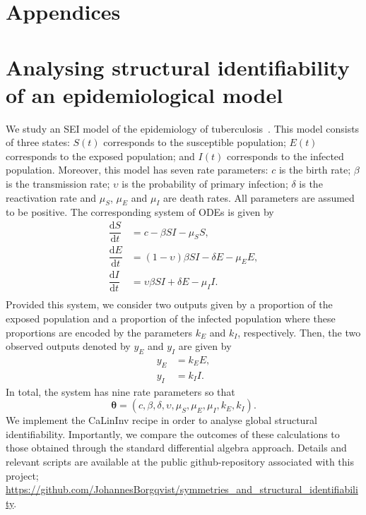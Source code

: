 \documentclass[12pt]{article}
\begin{document}





\section*{Appendices}



\section{Analysing structural identifiability of an epidemiological model}

We study an SEI model of the epidemiology of tuberculosis~\cite{renardy2022structural}. This model consists of three states: $S(t)$ corresponds to the susceptible population; $E(t)$ corresponds to the exposed population; and $I(t)$ corresponds to the infected population. Moreover, this model has seven rate parameters: $c$ is the birth rate; $\beta$ is the transmission rate; $\upsilon$ is the probability of primary infection; $\delta$ is the reactivation rate and $\mu_{S}$, $\mu_{E}$ and $\mu_{I}$ are death rates. All parameters are assumed to be positive. The corresponding system of ODEs is given by
\begin{equation}
    \begin{split}
\dfrac{\mathrm{d}S}{\mathrm{d}t}&=c-\beta SI-\mu_{S}S,\\
\dfrac{\mathrm{d}E}{\mathrm{d}t}&=(1-\upsilon)\beta SI-\delta E-\mu_{E}E,\\
\dfrac{\mathrm{d}I}{\mathrm{d}t}&=\upsilon\beta SI+\delta E-\mu_{I}I.\\
\end{split}
    \label{eq:SEI_app}
\end{equation}
Provided this system, we consider two outputs given by a proportion of the exposed population and a proportion of the infected population where these proportions are encoded by the parameters $k_{E}$ and $k_{I}$, respectively. Then, the two observed outputs denoted by $y_{E}$ and $y_{I}$ are given by
\begin{align}
    y_{E}&=k_{E}E,\label{eq:output_E_app}\\
    y_{I}&=k_{I}I.\label{eq:output_I_app}
\end{align}
In total, the system has nine rate parameters so that
\begin{equation}
\boldsymbol{\theta}=(c,\beta,\delta,\upsilon,\mu_{S},\mu_{E},\mu_{I},k_{E},k_{I}).
\label{eq:theta_SEI_app}
\end{equation}
We implement the CaLinInv recipe in order to analyse global structural identifiability. Importantly, we compare the outcomes of these calculations to those obtained through the standard differential algebra approach. Details and relevant scripts are  available at the public github-repository associated with this project; \url{https://github.com/JohannesBorgqvist/symmetries_and_structural_identifiability}.
\end{document}

